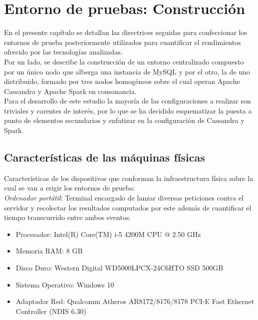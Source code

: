 
\pagestyle{fancy}

\chapter{Entorno de pruebas: Construcción}
\label{entorno_pruebas}

En el presente capítulo se detallan las directrices seguidas para confeccionar los entornos de prueba posteriormente utilizados para cuantificar el rendimientos ofrecido por las tecnologías analizadas.\\

 Por un lado, se describe la construcción de un entorno centralizado compuesto por un único nodo que alberga una instancia de MySQL y por el otro, la de uno distribuido, formado por tres nodos homogéneos sobre el cual operan Apache Cassandra y Apache Spark en consonancia.\\

Para el desarrollo de este estudio la mayoría de las configuraciones a realizar son triviales y carentes de interés, por lo que se ha decidido esquematizar la puesta a punto de elementos secundarios y enfatizar en la configuración de Cassandra y Spark.\\

\section{Características de las máquinas físicas}

Características de los dispositivos que conforman la infraestructura física sobre la cual se van a erigir los entornos de prueba:\\

\textit{Ordenador portátil}: Terminal encargado de lanzar diversas peticiones contra el servidor y recolectar los resultados computados por este además de cuantificar el tiempo transcurrido entre ambos eventos.\\ 

\begin{itemize}
	\item Procesador: Intel(R) Core(TM) i-5 4200M CPU @ 2.50 GHz
	\item Memoria RAM: 8 GB
	\item Disco Duro: Western Digital WD5000LPCX-24C6HTO SSD 500GB
	\item Sistema Operativo: Windows 10
	\item Adaptador Red: Qualcomm Atheros AR8172/8176/8178 PCI-E Fast Ethernet Controller (NDIS 6.30)
\end{itemize}

